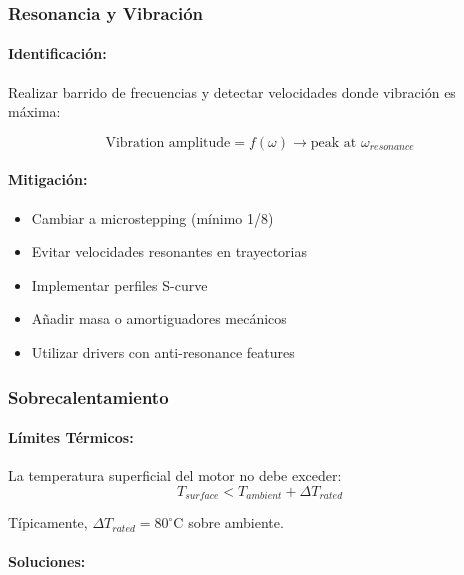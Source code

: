 \subsubsection{Resonancia y Vibración}

\paragraph{Identificación:}

Realizar barrido de frecuencias y detectar velocidades donde vibración es máxima:

\begin{equation}
\text{Vibration amplitude} = f(\omega) \rightarrow \text{peak at } \omega_{resonance}
\end{equation}

\paragraph{Mitigación:}

\begin{itemize}
    \item Cambiar a microstepping (mínimo 1/8)
    \item Evitar velocidades resonantes en trayectorias
    \item Implementar perfiles S-curve
    \item Añadir masa o amortiguadores mecánicos
    \item Utilizar drivers con anti-resonance features
\end{itemize}

\subsubsection{Sobrecalentamiento}

\paragraph{Límites Térmicos:}

La temperatura superficial del motor no debe exceder:
\begin{equation}
T_{surface} < T_{ambient} + \Delta T_{rated}
\end{equation}

Típicamente, $\Delta T_{rated} = 80^\circ$C sobre ambiente.

\paragraph{Soluciones:}

